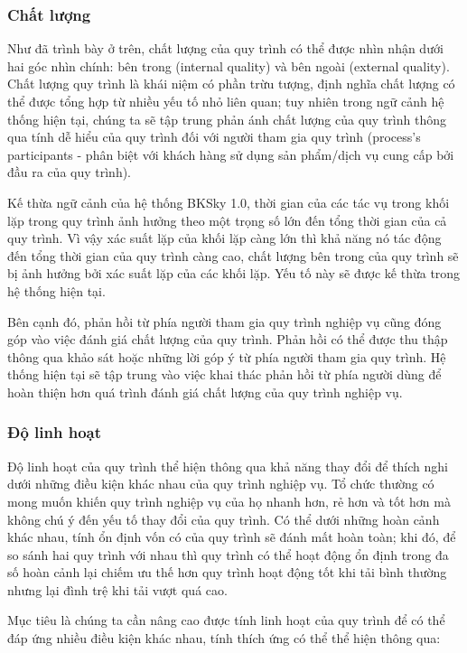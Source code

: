\subsubsection{Chất lượng}

Như đã trình bày ở trên, chất lượng của quy trình có thể được nhìn nhận dưới hai góc nhìn chính: bên
trong (internal quality) và bên ngoài (external quality). Chất lượng quy trình
là khái niệm có phần trừu tượng, định nghĩa chất lượng có thể được tổng hợp từ
nhiều yếu tố nhỏ liên quan; tuy nhiên trong ngữ cảnh hệ thống hiện tại, chúng
ta sẽ tập trung phản ánh chất lượng của quy trình thông qua tính dễ hiểu của
quy trình đối với người tham gia quy trình (process's participants - phân biệt
với khách hàng sử dụng sản phẩm/dịch vụ cung cấp bởi đầu ra của quy trình).

Kế thừa ngữ cảnh của hệ thống BKSky 1.0, thời gian của các tác vụ trong khối
lặp trong quy trình ảnh hưởng theo một trọng số lớn đến tổng thời gian của cả
quy trình. Vì vậy xác suất lặp của khối lặp càng lớn thì khả năng nó tác động
đến tổng thời gian của quy trình càng cao, chất lượng bên trong của quy trình
sẽ bị ảnh hưởng bởi xác suất lặp của các khối lặp. Yếu tố này sẽ được kế thừa
trong hệ thống hiện tại.

Bên cạnh đó, phản hồi từ phía người tham gia quy trình nghiệp vụ cũng đóng góp
vào việc đánh giá chất lượng của quy trình. Phản hồi có thể được thu thập thông
qua khảo sát hoặc những lời góp ý từ phía người tham gia quy trình. Hệ thống
hiện tại sẽ tập trung vào việc khai thác phản hồi từ phía người dùng để hoàn
thiện hơn quá trình đánh giá chất lượng của quy trình nghiệp vụ.
\subsubsection{Độ linh hoạt}

Độ linh hoạt của quy trình thể hiện thông qua khả năng thay đổi để thích nghi dưới những điều kiện khác nhau của quy trình nghiệp vụ. Tổ chức thường có mong muốn khiến quy trình nghiệp vụ của họ nhanh hơn, rẻ hơn và tốt hơn mà không chú ý đến yếu tố thay đổi của quy trình. Có thể dưới những hoàn cảnh khác nhau, tính ổn định vốn có của quy trình sẽ đánh mất hoàn toàn; khi đó, để so sánh hai quy trình với nhau thì quy trình có thể hoạt động ổn định trong đa số hoàn cảnh lại chiếm ưu thế hơn quy trình hoạt động tốt khi tải bình thường nhưng lại đình trệ khi tải vượt quá cao.

Mục tiêu là chúng ta cần nâng cao được tính linh hoạt của quy trình để có thể
đáp ứng nhiều điều kiện khác nhau, tính thích ứng có thể thể hiện thông qua:


